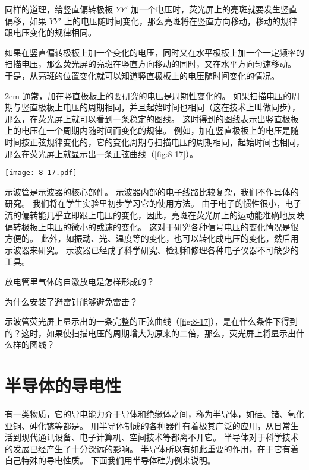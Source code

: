 同样的道理，给竖直偏转极板 $YY'$ 加一个电压时，荧光屏上的亮斑就要发生竖直偏移，如果 $YY'$ 上的电压随时间变化，那么亮斑将在竖直方向移动，移动的规律跟电压变化的规律相同。

如果在竖直偏转极板上加一个变化的电压，同时又在水平极板上加一个一定频率的扫描电压，那么荧光屏的亮斑在竖直方向移动的同时，又在水平方向匀速移动。
于是，从亮斑的位置变化就可以知道竖直极板上的电压随时间变化的情况。

\medskip\noindent
\begin{minipage}{0.7\linewidth}\parindent2em
通常，加在竖直极板上的要研究的电压是周期性变化的。
如果扫描电压的周期与竖直极板上电压的周期相同，并且起始时间也相同（这在技术上叫做同步），那么，在荧光屏上就可以看到一条稳定的图线。
这时得到的图线表示出竖直极板上的电压在一个周期内随时间而变化的规律。
例如，加在竖直极板上的电压是随时间按正弦规律变化的，它的变化周期与扫描电压的周期相同，起始时间也相同，那么在荧光屏上就显示出一条正弦曲线（\cref{fig:8-17}）。
\end{minipage}\hfill
\begin{minipage}{0.25\linewidth}\centering
\begin{figurehere}
  \texttt{[image: 8-17.pdf]}
  \caption{}\label{fig:8-17}
\end{figurehere}
\end{minipage}

\medskip
示波管是示波器的核心部件。
示波器内部的电子线路比较复杂，我们不作具体的研究。
我们将在学生实验里初步学习它的使用方法。
由于电子的惯性很小，电子流的偏转能几乎立即跟上电压的变化，因此，亮斑在荧光屏上的运动能准确地反映偏转极板上电压的微小的或速的变化。
这对于研究各种信号电压的变化情况是很方便的。
此外，如振动、光、温度等的变化，也可以转化成电压的变化，然后用示波器来研究。
示波器已经成了科学研究、检测和修理各种电子仪器不可缺少的工具。


\begin{Practice}
\begin{question}
  \item 放电管里气体的自激放电是怎样形成的？
  \item 为什么安装了避雷针能够避免雷击？
  \item 示波管荧光屏上显示出的一条完整的正弦曲线（\cref{fig:8-17}），是在什么条件下得到的？这时，如果使扫描电压的周期增大为原来的二倍，那么，荧光屏上将显示出什么样的图线？
\end{question}
\end{Practice}


\section{半导体的导电性}
有一类物质，它的导电能力介于导体和绝缘体之间，称为半导体，如硅、锗、氧化亚铜、砷化镓等都是。
用半导体制成的各种器件有着极其广泛的应用，从日常生活到现代通讯设备、电子计算机、空间技术等都离不开它。
半导体对于科学技术的发展已经产生了十分深远的影响。
半导体所以有如此重要的作用，在于它有着自己特殊的导电性质。
下面我们用半导体硅为例来说明。

